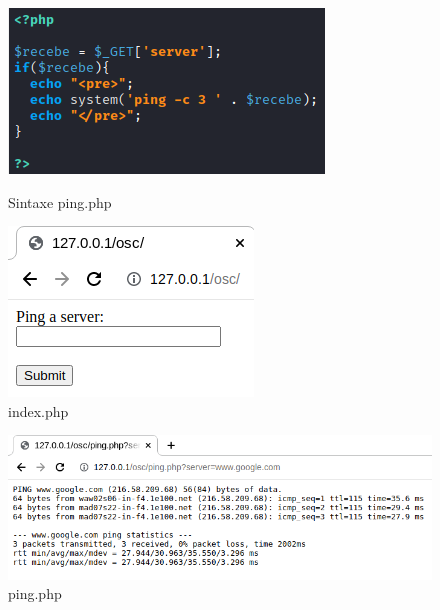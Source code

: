 \documentclass{report}
\begin{document}
\begin{figure}[!htb]
  \includegraphics[width=\linewidth]{imagessqlcode/sqlicode5.png}
  \caption{Sintaxe ping.php}\label{ping.php}
\endminipage\hfill
{}
  \includegraphics[width=\linewidth]{imagessql/Fig19.png}
  \caption{index.php}\label{index.php}
\endminipage
\end{figure}

\begin{figure}[!htb]
  \includegraphics[width=\linewidth]{imagessql/Fig20.png}
  \caption{ping.php}\label{ping.php}
\endminipage
\end{figure}
\clearpage
\end{document}
